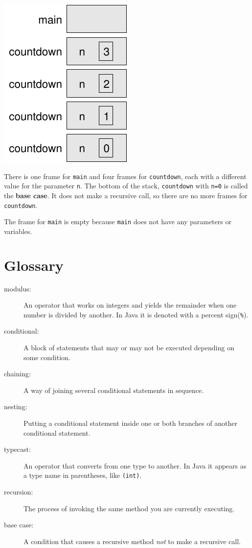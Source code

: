 \documentclass[12pt]{book}
\theoremstyle{exercise}
\begin{document}
\includegraphics{figs/stack2.pdf}

There is one frame for {\tt main} and four frames for {\tt countdown},
each with a different value for the parameter {\tt n}.  The bottom of
the stack, {\tt countdown} with {\tt n=0} is called the {\bf base
  case}.  It does not make a recursive call, so there are no more
frames for {\tt countdown}.

The frame for {\tt main} is empty because {\tt main} does not
have any parameters or variables.


\section{Glossary}

\begin{description}

\item[modulus:]  An operator that works on integers and yields
the remainder when one number is divided by another.  In Java
it is denoted with a percent sign({\tt \%}).

\item[conditional:]  A block of statements that may or may not
be executed depending on some condition.

\item[chaining:]  A way of joining several conditional statements
in sequence.

\item[nesting:] Putting a conditional statement inside one or both
branches of another conditional statement.

\item[typecast:]  An operator that converts from one type to another.
In Java it appears as a type name in parentheses, like {\tt(int)}.

\item[recursion:]  The process of invoking the same method you
are currently executing.

\item[base case:] A condition that causes a recursive method {\em not}
  to make a recursive call.



\end{description}
\end{document}
